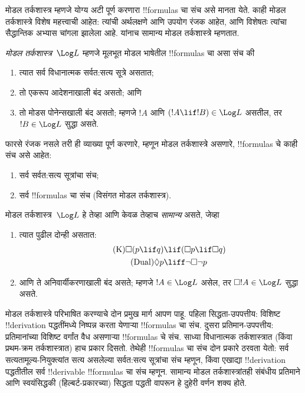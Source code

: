 \documentclass[../../../include/open-logic-section]{subfiles}
\begin{document}


मोडल तर्कशास्त्र म्हणजे योग्य अटी पूर्ण करणारा
!!{formula}s चा संच असे मानता येते. काही मोडल
तर्कशास्त्रे विशेष महत्त्वाची आहेत: त्यांची अर्थलक्षणे
आणि उपयोग रंजक आहेत, आणि विशेषतः त्यांचा
सैद्धान्तिक अभ्यास चांगला झालेला आहे. यांनाच
सामान्य मोडल तर्कशास्त्रे म्हणतात.

\begin{defn}
\emph{मोडल तर्कशास्त्र}~$\Log L$ म्हणजे मूलभूत
मोडल भाषेतील !!{formula}s चा असा संच की
\begin{enumerate}
\item त्यात सर्व विधानात्मक सर्वत:सत्य सूत्रे असतात;
\item तो एकरूप आदेशनाखाली बंद असतो; आणि
\item तो मोडस पोनेन्सखाली बंद असतो; म्हणजे $!A$ आणि
  $(!A \lif !B) \in \Log L$ असतील, तर
  $!B \in \Log L$ सुद्धा असते.
\end{enumerate}
\end{defn}

\begin{ex}
फारसे रंजक नसले तरी ही व्याख्या पूर्ण करणारे,
म्हणून मोडल तर्कशास्त्रे असणारे, !!{formula}s
चे काही संच असे आहेत:
\begin{enumerate}
\item सर्व सर्वत:सत्य सूत्रांचा संच;
\item सर्व !!{formula}s चा संच (विसंगत मोडल तर्कशास्त्र).
\end{enumerate}
\end{ex}

\begin{defn}\label{defn:normal-modal-logic}
मोडल तर्कशास्त्र~$\Log L$ हे तेव्हा आणि केवळ
तेव्हाच \emph{सामान्य} असते, जेव्हा
\begin{enumerate}
\item त्यात पुढील दोन्ही असतात:
\begin{align}
\tag{K} \Box(p \lif q) & \lif (\Box p \lif \Box q) \\
\tag{Dual} \Diamond p & \liff \lnot \Box \lnot p
\end{align}
\item आणि ते अनिवार्यीकरणाखाली बंद असते; म्हणजे
  $!A \in \Log L$ असेल, तर
  $\Box !A \in \Log L$ सुद्धा असते.
\end{enumerate}
\end{defn}

मोडल तर्कशास्त्रे परिभाषित करण्याचे दोन प्रमुख
मार्ग आपण पाहू. पहिला सिद्धता-उपपत्तीय: विशिष्ट
!!{derivation} पद्धतींमध्ये निष्पन्न करता येणाऱ्या
!!{formula}s चा संच. दुसरा प्रतिमान-उपपत्तीय:
प्रतिमानांच्या विशिष्ट वर्गांत वैध असणाऱ्या
!!{formula}s चे संच. साध्या विधानात्मक तर्कशास्त्रात
(किंवा प्रथम-क्रम तर्कशास्त्रात) हाच प्रकार दिसतो.
तेथेही !!{formula}s चा संच दोन प्रकारे ठरवता येतो:
सर्व सत्यतामूल्य-नियुक्त्यांत सत्य असलेल्या
सर्वत:सत्य सूत्रांचा संच म्हणून, किंवा एखाद्या
!!{derivation} पद्धतीतील सर्व !!{derivable}
!!{formula}s चा संच म्हणून. सामान्य मोडल
तर्कशास्त्रांतही संबंधीय प्रतिमाने आणि स्वयंसिद्धकी
(हिल्बर्ट-प्रकारच्या) सिद्धता पद्धती वापरून हे
दुहेरी वर्णन शक्य होते.
\end{document}
